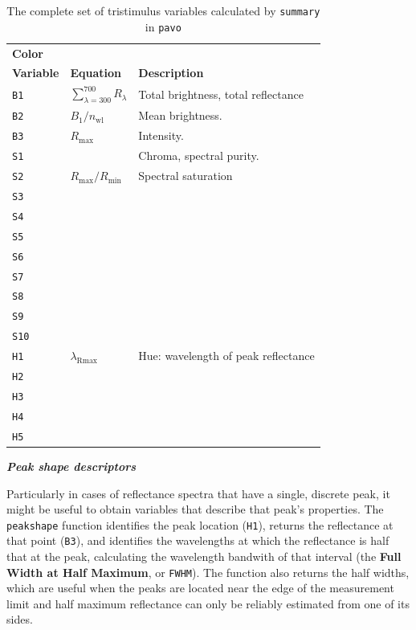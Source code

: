 \documentclass{article}
\newcommand{\pavo}{{\tt pavo}}  %
\newcommand{\code}[1]{{\tt #1}}  %
\begin{document}
\begin{table}[h]
\begin{center}
\begin{tabular}{l l l} \hline
{\bf Color} & \\
{\bf Variable} & {\bf Equation} & {\bf Description} \\ 
\hline
\code{B1} & {$\sum_{\lambda={300}}^{700} R_\lambda$} & \parbox[t]{3in}{Total brightness, total reflectance}  \\
\code{B2} & {$B_\text{1}/n_\text{wl}$} & \parbox[t]{3in}{Mean brightness.} \\
\code{B3} & {$R_\text{max}$} & \parbox[t]{3in}{Intensity.} \\
\code{S1} & {} & \parbox[t]{3in}{Chroma, spectral purity.} \\
\code{S2} & {$R_\text{max}/R_\text{min}$} & \parbox[t]{3in}{Spectral saturation} \\
\code{S3} & {} & \parbox[t]{3in}{} \\
\code{S4} & {} & \parbox[t]{3in}{} \\
\code{S5} & {} & \parbox[t]{3in}{} \\
\code{S6} & {} & \parbox[t]{3in}{} \\
\code{S7} & {} & \parbox[t]{3in}{} \\
\code{S8} & {} & \parbox[t]{3in}{} \\
\code{S9} & {} & \parbox[t]{3in}{} \\
\code{S10} & {} & \parbox[t]{3in}{} \\
\code{H1} & {$\lambda_\text{Rmax}$} & \parbox[t]{3in}{Hue: wavelength of peak reflectance} \\
\code{H2} & {} & \parbox[t]{3in}{} \\
\code{H3} & {} & \parbox[t]{3in}{} \\
\code{H4} & {} & \parbox[t]{3in}{} \\
\code{H5} & {} & \parbox[t]{3in}{} \\
\hline
\end{tabular}
\end{center}
\caption{\label{table:tristim}
The complete set of tristimulus variables calculated by \code{summary} in \pavo{}}
\end{table}

\clearpage{}

\textit{\textbf{Peak shape descriptors}}

Particularly in cases of reflectance spectra that have a single, discrete peak, it might be useful to obtain variables that describe that peak's properties. The \code{peakshape} function identifies the peak location (\code{H1}),  returns the reflectance at that point (\code{B3}), and identifies the wavelengths at which the reflectance is half that at the peak, calculating the wavelength bandwith of that interval (the \textbf{Full Width at Half Maximum}, or \code{FWHM}). The function also returns the half widths, which are useful when the peaks are located near the edge of the measurement limit and half maximum reflectance can only be reliably estimated from one of its sides.
\end{document}
